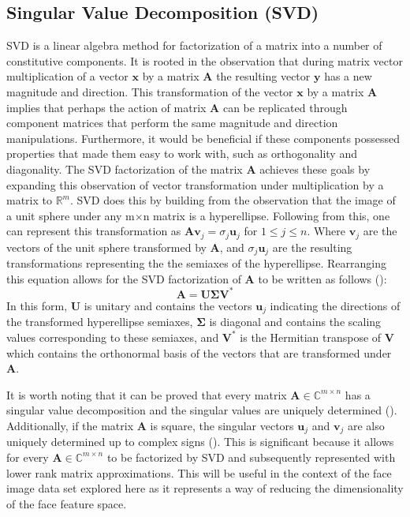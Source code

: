 \documentclass{article}
\begin{document}
\subsection{Singular Value Decomposition (SVD)}\label{svdTheory}
SVD is a linear algebra method for factorization of a matrix into a number of constitutive components. It is rooted in the observation that during matrix vector multiplication of a vector $\mathbf{x}$ by a matrix $\mathbf{A}$ the resulting vector $\mathbf{y}$ has a new magnitude and direction. This transformation of the vector $\mathbf{x}$ by a matrix $\mathbf{A}$ implies that perhaps the action of matrix $\mathbf{A}$ can be replicated through component matrices that perform the same magnitude and direction manipulations. Furthermore, it would be beneficial if these components possessed properties that made them easy to work with, such as orthogonality and diagonality. The SVD factorization of the matrix $\mathbf{A}$ achieves these goals by expanding this observation of vector transformation under multiplication by a matrix to $\mathbb{R}^{m}$. SVD does this by building from the observation that the image of a unit sphere under any m$\times$n matrix is a hyperellipse. Following from this, one can represent this transformation as $\mathbf{A}\mathbf{v}_{j} = \sigma_{j}\mathbf{u}_{j}$ for $1\leq j\leq n$. Where $\mathbf{v}_{j}$ are the vectors of the unit sphere transformed by $\mathbf{A}$, and $\sigma_{j}\mathbf{u}_{j}$ are the resulting transformations representing the the semiaxes of the hyperellipse. Rearranging this equation allows for the SVD factorization of $\mathbf{A}$ to be written as follows (\cite{kutz_2013}):
\begin{equation}\label{eq:svd}
\mathbf{A}= \mathbf{U}\boldsymbol{\Sigma} \mathbf{V}^*
\end{equation}
In this form, $\mathbf{U}$ is unitary and contains the vectors $\mathbf{u}_{j}$ indicating the directions of the transformed hyperellipse semiaxes, $\boldsymbol{\Sigma}$ is diagonal and contains the scaling values corresponding to these semiaxes, and $\mathbf{V}^{*}$ is the Hermitian transpose of $\mathbf{V}$ which contains the orthonormal basis of the vectors that are transformed under $\mathbf{A}$.

It is worth noting that it can be proved that every matrix $\mathbf{A}\in\mathbb{C}^{m\times n}$ has a singular value decomposition and the singular values are uniquely determined (\cite{kutz_2013}). Additionally, if the matrix $\mathbf{A}$ is square, the singular vectors $\mathbf{u}_{j}$ and $\mathbf{v}_{j}$ are also uniquely determined up to complex signs (\cite{kutz_2013}). This is significant because it allows for every $\mathbf{A}\in\mathbb{C}^{m\times n}$ to be factorized by SVD and subsequently represented with lower rank matrix approximations. This will be useful in the context of the face image data set explored here as it represents a way of reducing the dimensionality of the face feature space.
\end{document}
